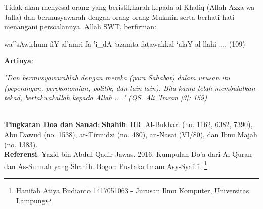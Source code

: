 \documentclass[a4paper,12pt]{article}
\begin{document}
\par
\indent
Tidak akan menyesal orang yang beristikharah kepada al-Khaliq (Allah Azza 
wa Jalla) dan bermusyawarah dengan orang-orang Mukmin serta berhati-hati 
menangani persoalannya. Allah SWT. berfirman:\\
\begin{arabtext}
\noindent
wa^sAwirhum fiY al'amri fa-'i_dA `azamta fatawakkal `alaY al-llahi .... 
(109)\\
\end{arabtext}
\noindent
\textbf{Artinya}:
\par
\indent
\textit{"Dan bermusyawarahlah dengan mereka (para Sahabat) dalam urusan itu 
(peperangan, perekonomian, politik, dan lain-lain). Bila kamu telah 
membulatkan tekad, bertakwakallah kepada Allah ...." (QS. Ali 'Imran 
[3]: 159)}\\\\
\par
\noindent
\textbf{Tingkatan Doa dan Sanad}: \textbf{Shahih}: HR. Al-Bukhari (no. 
1162, 6382, 7390), Abu Dawud (no. 1538), at-Tirmidzi (no. 480), an-Nasai 
(VI/80), dan Ibnu Majah (no. 1383).\\
\textbf{Referensi}: Yazid bin Abdul Qadir Jawas. 2016. Kumpulan Do'a dari
Al-Quran dan As-Sunnah yang Shahih. Bogor: Pustaka Imam Asy-Syafi'i.
\footnote{Hanifah Atiya Budianto 1417051063 - Jurusan Ilmu Komputer,
Universitas Lampung}
\end{document}
